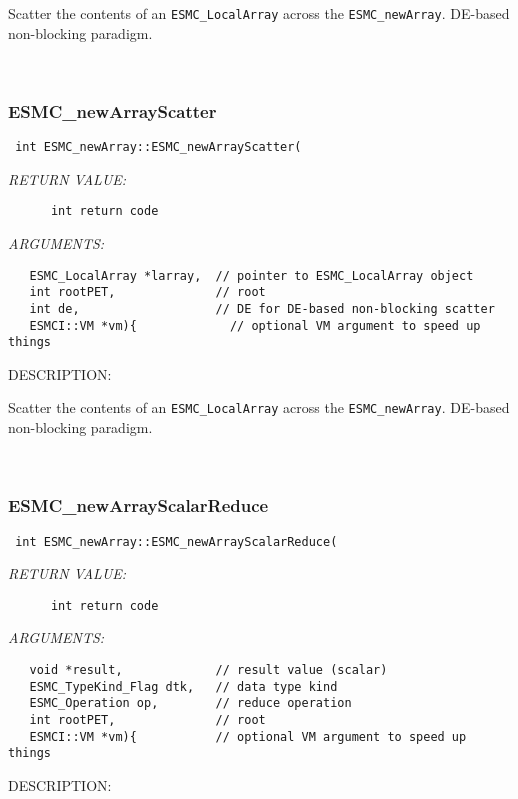       Scatter the contents of an {\tt ESMC\_LocalArray} across the
      {\tt ESMC\_newArray}. DE-based non-blocking paradigm.
   
 
\mbox{}\hrulefill\
 
\subsubsection [ESMC\_newArrayScatter] {ESMC\_newArrayScatter}


  
\begin{verbatim} int ESMC_newArray::ESMC_newArrayScatter(\end{verbatim}{\em RETURN VALUE:}
\begin{verbatim}      int return code\end{verbatim}{\em ARGUMENTS:}
\begin{verbatim}   ESMC_LocalArray *larray,  // pointer to ESMC_LocalArray object
   int rootPET,              // root
   int de,                   // DE for DE-based non-blocking scatter
   ESMCI::VM *vm){             // optional VM argument to speed up things\end{verbatim}
{\sf DESCRIPTION:\\ }


      Scatter the contents of an {\tt ESMC\_LocalArray} across the
      {\tt ESMC\_newArray}. DE-based non-blocking paradigm.
   
 
\mbox{}\hrulefill\
 
\subsubsection [ESMC\_newArrayScalarReduce] {ESMC\_newArrayScalarReduce}


  
\begin{verbatim} int ESMC_newArray::ESMC_newArrayScalarReduce(\end{verbatim}{\em RETURN VALUE:}
\begin{verbatim}      int return code\end{verbatim}{\em ARGUMENTS:}
\begin{verbatim}   void *result,             // result value (scalar)
   ESMC_TypeKind_Flag dtk,   // data type kind
   ESMC_Operation op,        // reduce operation
   int rootPET,              // root
   ESMCI::VM *vm){           // optional VM argument to speed up things\end{verbatim}
{\sf DESCRIPTION:\\ }


